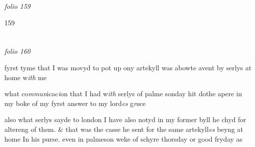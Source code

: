 \documentclass[12pt, a4paper]{book}
\begin{document}

\textit{folio 159}


\begin{flushright}{\color{Mahogany}159}\end{flushright}

\dotfill
						\newpage {} \section*{}  \subsection*{}

\textit{folio 160}




            		
            			
				\marginpar[\vspace{0.5cm}{\textcolor{Gray}{i.}}]{}
			
            			
		\ifthenelse{\isodd{\thepage}}
		{\reversemarginpar}
		{\normalmarginpar}
		fyrst tyme that I was movyd to pot up ony artekyll was
	abowte avent by serlys at home w\textit{ith} me
            		
            		
            			
				\marginpar[\vspace{0.5cm}{\textcolor{Gray}{2.}}]{}
			
            			
		\ifthenelse{\isodd{\thepage}}
		{\reversemarginpar}
		{\normalmarginpar}
		what co\textit{mmun}icac\textit{i}on that I had w\textit{ith} serlys of palme sonday hit
            				dothe apere in my boke of my fyrst answer to my lord\textit{es} g\textit{ra}ce

            	
				\marginpar[\vspace{0.5cm}{\textcolor{Gray}{3.}}]{}
			
		\ifthenelse{\isodd{\thepage}}
		{\reversemarginpar}
		{\normalmarginpar}
		also what serlys sayde to london I have also notyd in my former
 byll he chyd for altereng of them. \& that was the casse he sent
 for the same artekyll\textit{es} beyng at home In his purse.
 even in palmeson weke of schyre thorsday or good fryday as
 

            	
				\marginpar[\vspace{0.5cm}{\textcolor{Gray}{4.}}]{}
			
\end{document}

